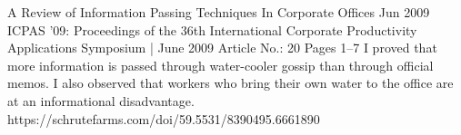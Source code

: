 \publication
{A Review of Information Passing Techniques In Corporate Offices}
{Jun 2009}
{ICPAS '09: Proceedings of the 36th International Corporate Productivity Applications Symposium | June 2009 Article No.: 20 Pages 1–7}
{I proved that more information is passed through water-cooler gossip than through official memos. I also observed that workers who bring their own water to the office are at an informational disadvantage.}
{https://schrutefarms.com/doi/59.5531/8390495.6661890}
